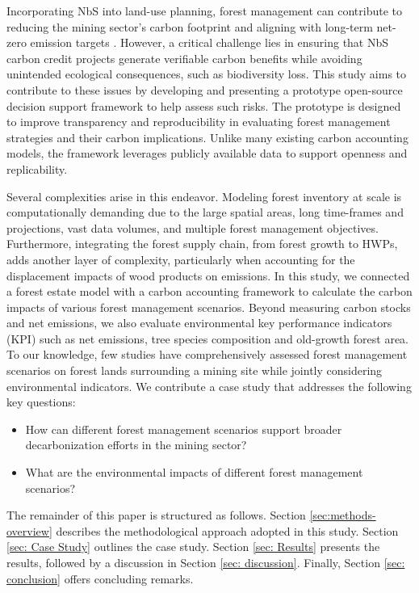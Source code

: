 \documentclass[preprint,12pt]{elsarticle}
\begin{document}
Incorporating NbS into land-use planning, forest management can contribute to reducing the mining sector’s carbon footprint and aligning with long-term net-zero emission targets \citep{smith2022long}.
However, a critical challenge lies in ensuring that NbS carbon credit projects generate verifiable carbon benefits while avoiding unintended ecological consequences, such as biodiversity loss. This study aims to contribute to these issues by developing and presenting a prototype open-source decision support framework to help assess such risks. The prototype is designed to improve transparency and reproducibility in evaluating forest management strategies and their carbon implications. Unlike many existing carbon accounting models, the framework leverages publicly available data to support openness and replicability.

Several complexities arise in this endeavor. Modeling forest inventory at scale is computationally demanding due to the large spatial areas, long time-frames and projections, vast data volumes, and multiple forest management objectives. Furthermore, integrating the forest supply chain, from forest growth to HWPs, adds another layer of complexity, particularly when accounting for the displacement impacts of wood products on emissions. In this study, we connected a forest estate model with a carbon accounting framework to calculate the carbon impacts of various forest management scenarios. Beyond measuring carbon stocks and net emissions, we also evaluate environmental key performance indicators (KPI) such as net emissions, tree species composition and old-growth forest area. To our knowledge, few studies have comprehensively assessed forest management scenarios on forest lands surrounding a mining site while jointly considering environmental indicators. We contribute a case study that addresses the following key questions:
\begin{itemize}
\item How can different forest management scenarios support broader decarbonization efforts in the mining sector?
\item What are the environmental impacts of different forest management scenarios?
\end{itemize}

The remainder of this paper is structured as follows. Section \ref{sec:methods-overview} describes the methodological approach adopted in this study. Section \ref{sec: Case Study} outlines the case study. Section \ref{sec: Results} presents the results, followed by a discussion in Section \ref{sec: discussion}. Finally, Section \ref{sec: conclusion} offers concluding remarks.
\end{document}
